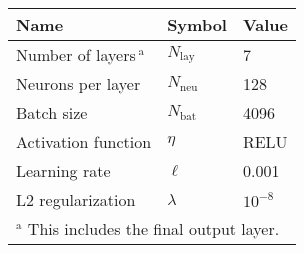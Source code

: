 \begin{tabular}[t]{lll}
    \hline
    Name & Symbol & Value\\
    \hline
    Number of layers\(\,^\mathrm{a}\) & \(N_\mathrm{lay}\) & 7 \\
    Neurons per layer & \(N_\mathrm{neu}\) & 128 \\
    Batch size & \(N_\mathrm{bat}\) & 4096 \\
    Activation function & \(\eta\) & RELU \\
    Learning rate & \(\ell\) & 0.001 \\
    L2 regularization & \(\lambda\) & \(10^{-8}\)\\
    \hline
    \multicolumn{3}{l}{\(^\mathrm{a}\) This includes the final output layer.}
\end{tabular}
